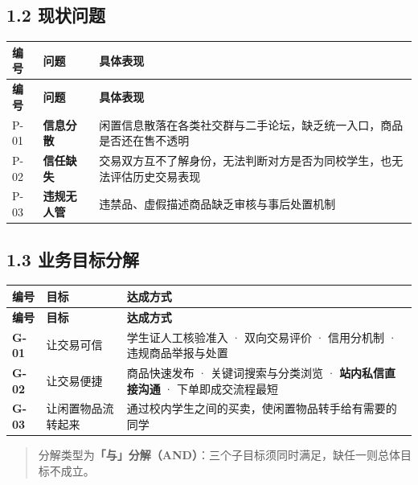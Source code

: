 \documentclass[12pt,a4paper]{ctexart}
\begin{document}
\subsection*{1.2 现状问题}

{\footnotesize
\begin{longtable}{|p{1.54cm}|p{2.81cm}|p{11.65cm}|}
\hline
\textbf{编号} & \textbf{问题} & \textbf{具体表现} \\
\hline
\endfirsthead
\hline
\textbf{编号} & \textbf{问题} & \textbf{具体表现} \\
\hline
\endhead
\hline
\endfoot
P-01 & \textbf{信息分散} & 闲置信息散落在各类社交群与二手论坛，缺乏统一入口，商品是否还在售不透明 \\
\hline
P-02 & \textbf{信任缺失} & 交易双方互不了解身份，无法判断对方是否为同校学生，也无法评估历史交易表现 \\
\hline
P-03 & \textbf{违规无人管} & 违禁品、虚假描述商品缺乏审核与事后处置机制 \\
\hline
\end{longtable}
}



\subsection*{1.3 业务目标分解}

{\footnotesize
\begin{longtable}{|p{1.53cm}|p{3.81cm}|p{10.66cm}|}
\hline
\textbf{编号} & \textbf{目标} & \textbf{达成方式} \\
\hline
\endfirsthead
\hline
\textbf{编号} & \textbf{目标} & \textbf{达成方式} \\
\hline
\endhead
\hline
\endfoot
\textbf{G-01} & 让交易可信 & 学生证人工核验准入 · 双向交易评价 · 信用分机制 · 违规商品举报与处置 \\
\hline
\textbf{G-02} & 让交易便捷 & 商品快速发布 · 关键词搜索与分类浏览 · \textbf{站内私信直接沟通} · 下单即成交流程最短 \\
\hline
\textbf{G-03} & 让闲置物品流转起来 & 通过校内学生之间的买卖，使闲置物品转手给有需要的同学 \\
\hline
\end{longtable}
}


\begin{quote}\small
分解类型为\textbf{「与」分解（AND）}：三个子目标须同时满足，缺任一则总体目标不成立。

\end{quote}
\end{document}
